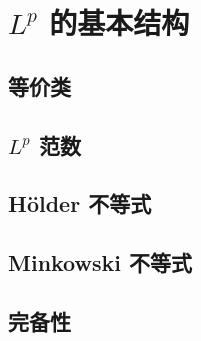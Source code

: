 \section{\texorpdfstring{\(L^p\)}{Lᵖ} 的基本结构}
\label{b1:sec:1001}


\subsection{等价类}
\label{b1:subsec:100101}

\subsection{\texorpdfstring{\(L^p\)}{Lp} 范数}
\label{b1:subsec:100102}

\subsection{Hölder 不等式}
\label{b1:subsec:100103}

\subsection{Minkowski 不等式}
\label{b1:subsec:100104}

\subsection{完备性}
\label{b1:subsec:100105}


